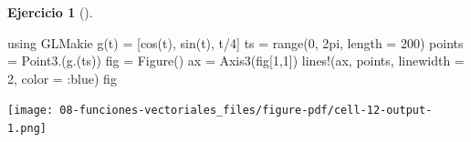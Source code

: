 \documentclass[
  a4paper,
]{scrreport}
\newenvironment{Shaded}{\begin{snugshade}}{\end{snugshade}}
\newcommand{\BuiltInTok}[1]{\textcolor[rgb]{0.00,0.23,0.31}{#1}}
\newcommand{\FloatTok}[1]{\textcolor[rgb]{0.68,0.00,0.00}{#1}}
\newcommand{\FunctionTok}[1]{\textcolor[rgb]{0.28,0.35,0.67}{#1}}
\newcommand{\ImportTok}[1]{\textcolor[rgb]{0.00,0.46,0.62}{#1}}
\newcommand{\NormalTok}[1]{\textcolor[rgb]{0.00,0.23,0.31}{#1}}
\newcommand{\OperatorTok}[1]{\textcolor[rgb]{0.37,0.37,0.37}{#1}}
\theoremstyle{definition}
\newtheorem{exercise}{Ejercicio}[chapter]
\theoremstyle{remark}
\begin{document}
\begin{exercise}[]
\begin{enumerate}
\begin{tcolorbox}
\begin{Shaded}
\begin{Highlighting}[]
\ImportTok{using} \BuiltInTok{GLMakie}
\FunctionTok{g}\NormalTok{(t) }\OperatorTok{=}\NormalTok{ [}\FunctionTok{cos}\NormalTok{(t), }\FunctionTok{sin}\NormalTok{(t), t}\OperatorTok{/}\FloatTok{4}\NormalTok{] }
\NormalTok{ts }\OperatorTok{=} \FunctionTok{range}\NormalTok{(}\FloatTok{0}\NormalTok{, }\FloatTok{2}\NormalTok{pi, length }\OperatorTok{=} \FloatTok{200}\NormalTok{)}
\NormalTok{points }\OperatorTok{=} \FunctionTok{Point3}\NormalTok{.(}\FunctionTok{g}\NormalTok{.(ts))}
\NormalTok{fig }\OperatorTok{=} \FunctionTok{Figure}\NormalTok{()}
\NormalTok{ax }\OperatorTok{=} \FunctionTok{Axis3}\NormalTok{(fig[}\FloatTok{1}\NormalTok{,}\FloatTok{1}\NormalTok{])}
\FunctionTok{lines!}\NormalTok{(ax, points, linewidth }\OperatorTok{=} \FloatTok{2}\NormalTok{, color }\OperatorTok{=} \OperatorTok{:}\NormalTok{blue)}
\NormalTok{fig}
\end{Highlighting}
\end{Shaded}

  \texttt{[image: 08-funciones-vectoriales\_files/figure-pdf/cell-12-output-1.png]}

  \end{tcolorbox}
\end{enumerate}

\end{exercise}
\end{document}
